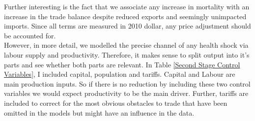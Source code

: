 \documentclass{article}
\begin{document}
Further interesting is the fact that we associate any increase in mortality with an increase in the trade balance despite reduced exports and seemingly unimpacted imports. Since all terms are measured in 2010 dollar, any price adjustment should be accounted for. \\
However, in more detail, we modelled the precise channel of any health shock via labour supply and productivity. Therefore, it makes sense to split output into it's parts and see whether both parts are relevant. In Table \ref{Second Stage Control Variables}, I included capital, population and tariffs. Capital and Labour are main production inputs. So if there is no reduction by including these two control variables we would expect productivity to be the main driver. Further, tariffs are included to correct for the most obvious obstacles to trade that have been omitted in the models but might have an influence in the data.
\end{document}
